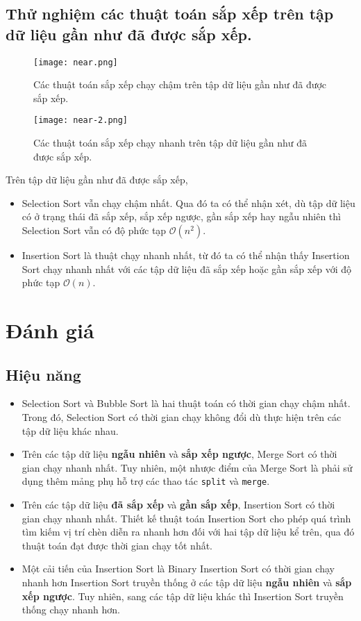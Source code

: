 \documentclass[]{article}
\begin{document}
\subsection{Thử nghiệm các thuật toán sắp xếp trên tập dữ liệu gần như đã được sắp xếp.}
\begin{figure}[H]
\centering
\texttt{[image: near.png]}
\caption{Các thuật toán sắp xếp chạy chậm trên tập dữ liệu gần như đã được sắp xếp.}
\end{figure}
\begin{figure}[H]
\centering
\texttt{[image: near-2.png]}
\caption{Các thuật toán sắp xếp chạy nhanh trên tập dữ liệu gần như đã được sắp xếp.}
\end{figure}
Trên tập dữ liệu gần như đã được sắp xếp,
\begin{itemize}
\item Selection Sort vẫn chạy chậm nhất. Qua đó ta có thể nhận xét, dù tập dữ liệu có ở trạng thái đã sắp xếp, sắp xếp ngược, gần sắp xếp hay ngẫu nhiên thì Selection Sort vẫn có độ phức tạp $\mathcal{O}(n^2)$.
\item Insertion Sort là thuật chạy nhanh nhất, từ đó ta có thể nhận thấy Insertion Sort chạy nhanh nhất với các tập dữ liệu đã sắp xếp hoặc gần sắp xếp với độ phức tạp $\mathcal{O}(n)$.
\end{itemize}

\section{Đánh giá}
\subsection{Hiệu năng}
\begin{itemize}
\item Selection Sort và Bubble Sort là hai thuật toán có thời gian chạy chậm nhất. Trong đó, Selection Sort có thời gian chạy không đổi dù thực hiện trên các tập dữ liệu khác nhau.
\item Trên các tập dữ liệu \textbf{ngẫu nhiên} và \textbf{sắp xếp ngược}, Merge Sort có thời gian chạy nhanh nhất. Tuy nhiên, một nhược điểm của Merge Sort là phải sử dụng thêm mảng phụ hỗ trợ các thao tác \texttt{split} và \texttt{merge}.
\item Trên các tập dữ liệu \textbf{đã sắp xếp} và \textbf{gần sắp xếp}, Insertion Sort có thời gian chạy nhanh nhất. Thiết kế thuật toán Insertion Sort cho phép quá trình tìm kiếm vị trí chèn diễn ra nhanh hơn đối với hai tập dữ liệu kể trên, qua đó thuật toán đạt được thời gian chạy tốt nhất.
\item Một cải tiến của Insertion Sort là Binary Insertion Sort có thời gian chạy nhanh hơn Insertion Sort truyền thống ở các tập dữ liệu \textbf{ngẫu nhiên} và \textbf{sắp xếp ngược}. Tuy nhiên, sang các tập dữ liệu khác thì Insertion Sort truyền thống chạy nhanh hơn.
\end{itemize}
\end{document}
